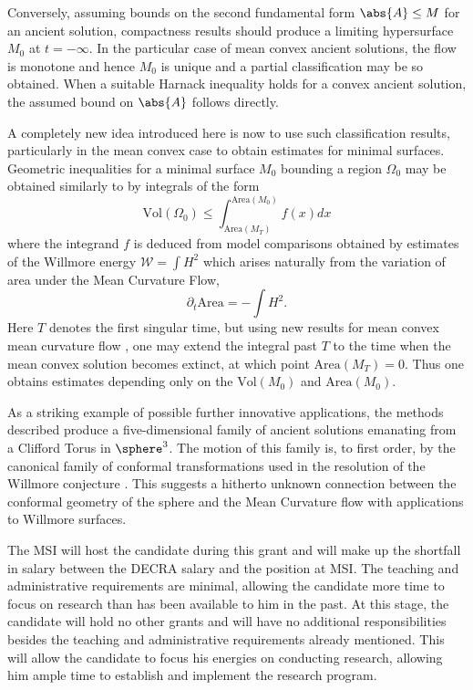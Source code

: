 \documentclass[12pt]{amsart}
\begin{document}
Conversely, assuming bounds on the second fundamental form $\abs{A} \leq M$ for an ancient solution, compactness results should produce a limiting hypersurface $M_0$ at $t=-\infty$. In the particular case of mean convex ancient solutions, the flow is monotone and hence $M_0$ is unique and a partial classification may be so obtained. When a suitable Harnack inequality holds for a convex ancient solution, the assumed bound on $\abs{A}$ follows directly.

A completely new idea introduced here is now to use such classification results, particularly in the mean convex case to obtain estimates for minimal surfaces. Geometric inequalities for a minimal surface $M_0$ bounding a region $\Omega_0$ may be obtained similarly to \cite{MR1650335} by integrals of the form
\[
\text{Vol}(\Omega_0) \leq \int_{\text{Area}(M_T)}^{\text{Area}(M_0)} f(x) dx
\]
where the integrand $f$ is deduced from model comparisons obtained by estimates of the Willmore energy $\mathcal{W} = \int H^2$ which arises naturally from the variation of area under the Mean Curvature Flow,
\[
\partial_t \text{Area} = -\int H^2.
\]
Here $T$ denotes the first singular time, but using new results for mean convex mean curvature flow \cite{2013arXiv1304.0926H,MR3570481}, one may extend the integral past $T$ to the time when the mean convex solution becomes extinct, at which point $\text{Area}(M_T) = 0$. Thus one obtains estimates depending only on the $\text{Vol}(M_0)$ and $\text{Area}(M_0)$.

As a striking example of possible further innovative applications, the methods described produce a five-dimensional family of ancient solutions emanating from a Clifford Torus in $\sphere^3$. The motion of this family is, to first order, by the canonical family of conformal transformations used in the resolution of the Willmore conjecture \cite{MR3152944}. This suggests a hitherto unknown connection between the conformal geometry of the sphere and the Mean Curvature flow with applications to Willmore surfaces.

\smallskip{}
\label{sec-4}
The MSI will host the candidate during this grant and will make up the shortfall in salary between the DECRA salary and the position at MSI. The teaching and administrative requirements are minimal, allowing the candidate more time to focus on research than has been available to him in the past. At this stage, the candidate will hold no other grants and will have no additional responsibilities besides the teaching and administrative requirements already mentioned. This will allow the candidate to focus his energies on conducting research, allowing him ample time to establish and implement the research program.
\end{document}

